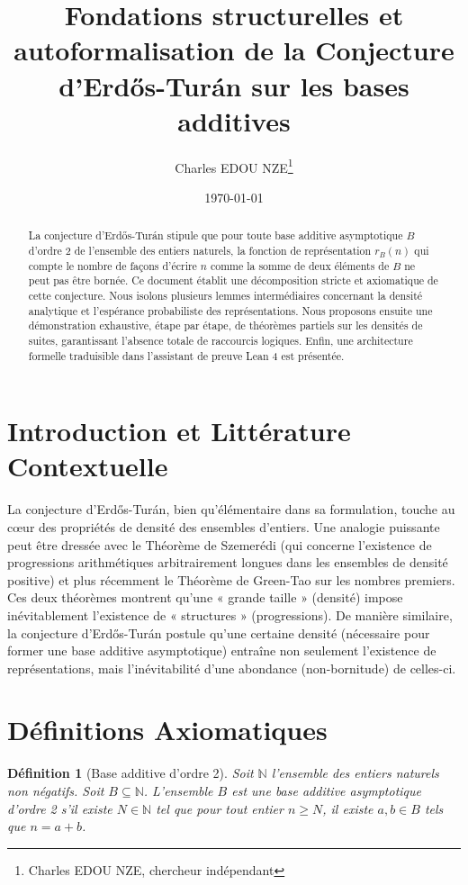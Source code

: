 \documentclass[12pt,a4paper]{article}
\title{Fondations structurelles et autoformalisation de la Conjecture d'Erdős-Turán sur les bases additives}
\author{Charles EDOU NZE\thanks{Charles EDOU NZE, chercheur indépendant}}
\date{\today}
\newtheorem{definition}[theorem]{Définition}
\begin{document}
\maketitle

\begin{abstract}
La conjecture d'Erdős-Turán stipule que pour toute base additive asymptotique $B$ d'ordre 2 de l'ensemble des entiers naturels, la fonction de représentation $r_B(n)$ qui compte le nombre de façons d'écrire $n$ comme la somme de deux éléments de $B$ ne peut pas être bornée.
Ce document établit une décomposition stricte et axiomatique de cette conjecture. Nous isolons plusieurs lemmes intermédiaires concernant la densité analytique et l'espérance probabiliste des représentations. Nous proposons ensuite une démonstration exhaustive, étape par étape, de théorèmes partiels sur les densités de suites, garantissant l'absence totale de raccourcis logiques. Enfin, une architecture formelle traduisible dans l'assistant de preuve Lean 4 est présentée.
\end{abstract}

\newpage
\tableofcontents
\newpage

\section{Introduction et Littérature Contextuelle}
La conjecture d'Erdős-Turán, bien qu'élémentaire dans sa formulation, touche au cœur des propriétés de densité des ensembles d'entiers.
Une analogie puissante peut être dressée avec le Théorème de Szemerédi (qui concerne l'existence de progressions arithmétiques arbitrairement longues dans les ensembles de densité positive) et plus récemment le Théorème de Green-Tao sur les nombres premiers.
Ces deux théorèmes montrent qu'une « grande taille » (densité) impose inévitablement l'existence de « structures » (progressions).
De manière similaire, la conjecture d'Erdős-Turán postule qu'une certaine densité (nécessaire pour former une base additive asymptotique) entraîne non seulement l'existence de représentations, mais l'inévitabilité d'une abondance (non-bornitude) de celles-ci.

\section{Définitions Axiomatiques}
\begin{definition}[Base additive d'ordre 2]
Soit $\mathbb{N}$ l'ensemble des entiers naturels non négatifs. Soit $B \subseteq \mathbb{N}$. L'ensemble $B$ est une base additive asymptotique d'ordre 2 s'il existe $N \in \mathbb{N}$ tel que pour tout entier $n \ge N$, il existe $a, b \in B$ tels que $n = a + b$.
\end{definition}
\end{document}

